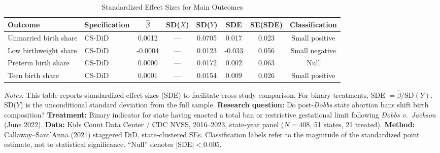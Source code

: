 \begin{table}[H]
\centering
\caption{Standardized Effect Sizes for Main Outcomes}
\label{tab:sde}
\begin{adjustbox}{max width=\textwidth}
\begin{tabular}{llcccccc}
\toprule
Outcome & Specification & $\hat{\beta}$ & SD($X$) & SD($Y$) & SDE & SE(SDE) & Classification \\
\midrule
Unmarried birth share & CS-DiD & 0.0012 & --- & 0.0705 & 0.017 & 0.023 & Small positive \\
Low birthweight share & CS-DiD & -0.0004 & --- & 0.0123 & -0.033 & 0.056 & Small negative \\
Preterm birth share & CS-DiD & 0.0000 & --- & 0.0172 & 0.002 & 0.063 & Null \\
Teen birth share & CS-DiD & 0.0001 & --- & 0.0154 & 0.009 & 0.026 & Small positive \\
\bottomrule
\end{tabular}
\end{adjustbox}
\par\vspace{0.3em}
{\footnotesize \emph{Notes:} This table reports standardized effect sizes (SDE) to facilitate cross-study comparison. For binary treatments, SDE $= \hat{\beta} / \text{SD}(Y)$. SD($Y$) is the unconditional standard deviation from the full sample. \textbf{Research question:} Do post-\emph{Dobbs} state abortion bans shift birth composition? \textbf{Treatment:} Binary indicator for state having enacted a total ban or restrictive gestational limit following \emph{Dobbs v.\ Jackson} (June 2022). \textbf{Data:} Kids Count Data Center / CDC NVSS, 2016--2023, state-year panel ($N=408$, 51 states, 21 treated). \textbf{Method:} Callaway--Sant'Anna (2021) staggered DiD, state-clustered SEs. Classification labels refer to the magnitude of the standardized point estimate, not to statistical significance. ``Null'' denotes $|$SDE$| < 0.005$.}
\end{table}
